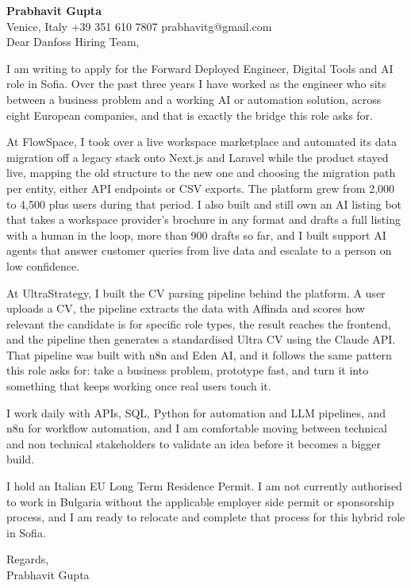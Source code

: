 \documentclass[a4paper,10.5pt]{article}
\begin{document}
\textbf{Prabhavit Gupta}\\
Venice, Italy \textbar{} +39 351 610 7807 \textbar{} prabhavitg@gmail.com\\[10pt]
Dear Danfoss Hiring Team,

I am writing to apply for the Forward Deployed Engineer, Digital Tools and AI role in Sofia. Over the past three years I have worked as the engineer who sits between a business problem and a working AI or automation solution, across eight European companies, and that is exactly the bridge this role asks for.

At FlowSpace, I took over a live workspace marketplace and automated its data migration off a legacy stack onto Next.js and Laravel while the product stayed live, mapping the old structure to the new one and choosing the migration path per entity, either API endpoints or CSV exports. The platform grew from 2,000 to 4,500 plus users during that period. I also built and still own an AI listing bot that takes a workspace provider's brochure in any format and drafts a full listing with a human in the loop, more than 900 drafts so far, and I built support AI agents that answer customer queries from live data and escalate to a person on low confidence.

At UltraStrategy, I built the CV parsing pipeline behind the platform. A user uploads a CV, the pipeline extracts the data with Affinda and scores how relevant the candidate is for specific role types, the result reaches the frontend, and the pipeline then generates a standardised Ultra CV using the Claude API. That pipeline was built with n8n and Eden AI, and it follows the same pattern this role asks for: take a business problem, prototype fast, and turn it into something that keeps working once real users touch it.

I work daily with APIs, SQL, Python for automation and LLM pipelines, and n8n for workflow automation, and I am comfortable moving between technical and non technical stakeholders to validate an idea before it becomes a bigger build.

I hold an Italian EU Long Term Residence Permit. I am not currently authorised to work in Bulgaria without the applicable employer side permit or sponsorship process, and I am ready to relocate and complete that process for this hybrid role in Sofia.

Regards,\\
Prabhavit Gupta
\end{document}
